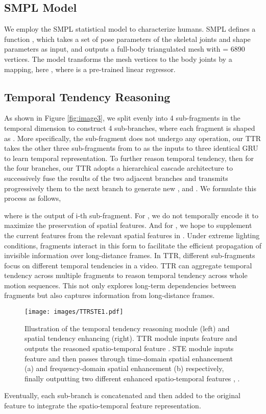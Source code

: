 \documentclass{bmvc2k}
\begin{document}
\subsection{SMPL Model}
We employ the SMPL statistical model to characterize humans.
SMPL defines a function , which takes a set of pose parameters  of the  skeletal joints and shape parameters  as input, and outputs a full-body triangulated mesh  with  = 6890 vertices. The model transforms the mesh vertices to the body joints  by a mapping, here , where  is a pre-trained linear regressor.

\subsection{Temporal Tendency Reasoning}
As shown in Figure \ref{fig:image3}, we split  evenly into 4 sub-fragments in the temporal dimension to construct 4 sub-branches, where each fragment is shaped as . More specifically, the  sub-fragment does not undergo any operation, our TTR takes the other three sub-fragments from  to  as the inputs to three identical GRU \cite{dey2017gate} to learn temporal representation. To further reason temporal tendency, then for the four branches, our TTR adopts a hierarchical cascade architecture to successively fuse the results of the two adjacent branches and transmits progressively them to the next branch to generate new ,  and . We formulate this process as follows,


where  is the output of i-th sub-fragment. For , we do not temporally encode it to maximize the preservation of spatial features. And for , we hope to supplement the current features from the relevant spatial features in . Under extreme lighting conditions, fragments interact in this form to facilitate the efficient propagation of invisible information over long-distance frames.
In TTR, different sub-fragments focus on different temporal tendencies in a video. 
TTR can aggregate temporal tendency across multiple fragments to reason temporal tendency across whole motion sequences. This not only explores long-term dependencies between fragments but also captures information from long-distance frames.
\begin{figure}
\centering
\texttt{[image: images/TTRSTE1.pdf]}
\caption{Illustration of the temporal tendency reasoning module (left) and spatial tendency enhancing (right). TTR module inputs feature  and outputs the reasoned spatio-temporal feature . STE module inputs feature  and then passes through time-domain spatial enhancement (a) and frequency-domain spatial enhancement (b) respectively, finally outputting two different enhanced spatio-temporal features , .}\label{fig:image3}
\label{fig4}
\end{figure}
Eventually, each sub-branch is concatenated and then added to the original feature  to integrate the spatio-temporal feature representation. 
\end{document}
